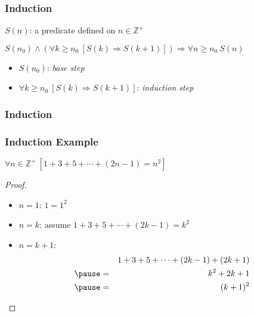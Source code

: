 \documentclass[dvipsnames]{beamer}
\begin{document}
\begin{frame}
  \frametitle{Induction}

  \begin{definition}
    $S(n)$: a predicate defined on $n \in \mathbb{Z}^+$

    \pause
    \medskip
    $S(n_0) \wedge (\forall k \geq n_0~[S(k) \Rightarrow S(k+1)])
      \Rightarrow \forall n \geq n_0~S(n)$
  \end{definition}

  \pause
  \medskip
  \begin{itemize}
    \item $S(n_0)$: \emph{base step}
    \item $\forall k \geq n_0~[S(k) \Rightarrow S(k+1)]$: \emph{induction step}
  \end{itemize}
\end{frame}

\begin{frame}
  \frametitle{Induction}

  \begin{center}
  \end{center}
\end{frame}

\begin{frame}
  \frametitle{Induction Example}

  \begin{theorem}
    $\forall n \in \mathbb{Z}^+~[1+3+5+\cdots+(2n-1)=n^2]$
  \end{theorem}

  \pause
  \begin{proof}
    \begin{itemize}
      \item $n=1$: $1=1^2$

      \pause
      \item $n=k$: assume $1+3+5+\cdots+(2k-1)=k^2$

      \pause
      \item $n=k+1$:
      \begin{eqnarray*}
        &   & 1+3+5+\cdots+(2k-1)+(2k+1)\\\pause
        & = & k^2+2k+1\\\pause
        & = & (k+1)^2
      \end{eqnarray*}
    \end{itemize}
  \end{proof}
\end{frame}
\end{document}
